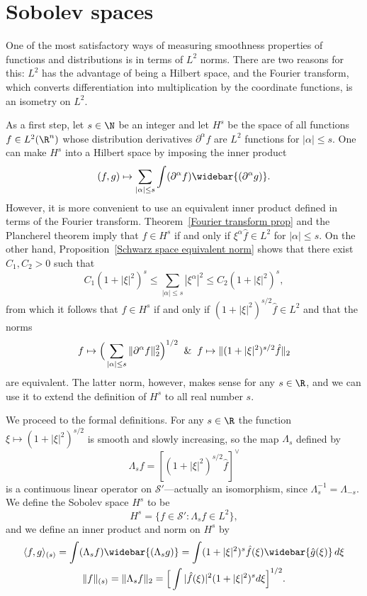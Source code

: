 \section{Sobolev spaces}
One of the most satisfactory ways of measuring smoothness properties of functions and distributions is in terms of $L^2$ norms. There are two reasons for this: $L^2$ has the advantage of being a Hilbert space, and the Fourier transform, which converts differentiation into multiplication by the coordinate functions, is an isometry on $L^2$.\par
As a first step, let $s\in\N$ be an integer and let $H^s$ be the space of all functions $f\in L^2(\R^n)$ whose distribution derivatives $\partial^\alpha f$ are $L^2$ functions for $|\alpha|\leq s$. One can make $H^s$ into a Hilbert space by imposing the inner product
\[(f,g)\mapsto\sum_{|\alpha|\leq s}\int(\partial^\alpha f)\widebar{(\partial^\alpha g)}.\]
However, it is more convenient to use an equivalent inner product defined in terms of the Fourier transform. Theorem~\ref{Fourier transform prop} and the Plancherel theorem imply that $f\in H^s$ if and only if $\xi^\alpha\hat{f}\in L^2$ for $|\alpha|\leq s$. On the other hand, Proposition~\ref{Schwarz space equivalent norm} shows that there exist $C_1,C_2>0$ such that
\[C_1(1+|\xi|^2)^s\leq\sum_{|\alpha|\leq s}|\xi^\alpha|^2\leq C_2(1+|\xi|^2)^s,\]
from which it follows that $f\in H^s$ if and only if $(1+|\xi|^2)^{s/2}\hat{f}\in L^2$ and that the norms
\[f\mapsto\Big(\sum_{|\alpha|\leq s}\|\partial^\alpha f\|_2^2\Big)^{1/2}\And f\mapsto\|(1+|\xi|^2)^{s/2}\hat{f}\|_2\]
are equivalent. The latter norm, however, makes sense for any $s\in\R$, and we can use it to extend the definition of $H^s$ to all real number $s$.\par
We proceed to the formal definitions. For any $s\in\R$ the function $\xi\mapsto(1+|\xi|^2)^{s/2}$ is smooth and slowly increasing, so the map $\Lambda_s$ defined by
\[\Lambda_sf=[(1+|\xi|^2)^{s/2}\hat{f}]^{\vee}\]
is a continuous linear operator on $\mathscr{S}'$---actually an isomorphism, since $\Lambda_s^{-1}=\Lambda_{-s}$. We define the Sobolev space $H^s$ to be
\[H^s=\{f\in\mathscr{S}':\Lambda_sf\in L^2\},\]
and we define an inner product and norm on $H^s$ by
\begin{gather*}
\langle f,g\rangle_{(s)}=\int(\Lambda_sf)\widebar{(\Lambda_sg)}=\int(1+|\xi|^2)^s\hat{f}(\xi)\widebar{\hat{g}(\xi)}\,d\xi\\
\|f\|_{(s)}=\|\Lambda_sf\|_2=\Big[\int|\hat{f}(\xi)|^2(1+|\xi|^2)^sd\xi\Big]^{1/2}.
\end{gather*}
